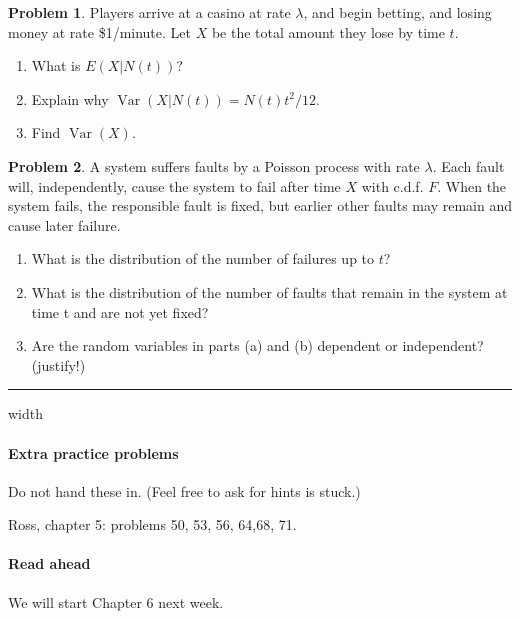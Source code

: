\documentclass{article}
\DeclareMathOperator{\Var}{Var}
\theoremstyle{definition}
\newtheorem{problem}{Problem}
\begin{document}

\begin{problem}
  Players arrive at a casino at rate $\lambda$, and begin betting, and losing money at rate \$1/minute.
  Let $X$ be the total amount they lose by time $t$.
  \begin{enumerate}
    \item What is $E(X|N(t))$?
    \item Explain why $\Var(X|N(t)) = N(t) t^2/12$.
    \item Find $\Var(X)$.
  \end{enumerate}
\end{problem}


\begin{problem}
  A system suffers faults by a Poisson process with rate $\lambda$.
  Each fault will, independently, cause the system to fail after time $X$ with
  c.d.f. $F$.
  When the system fails, the responsible fault is fixed, but earlier other faults may remain and cause later failure.
  \begin{enumerate}
  \item What is the distribution of the number of failures up to $t$?
  \item What is the distribution of the number of faults that remain in the system at time t and are not yet fixed?
  \item Are the random variables in parts (a) and (b) dependent or independent? (justify!)
  \end{enumerate}
\end{problem}


\hrule width \textwidth

\paragraph{Extra practice problems}
Do not hand these in. (Feel free to ask for hints is stuck.)

Ross, chapter 5: problems 50, 53, 56, 64,68, 71.

\paragraph{Read ahead}
We will start Chapter 6 next week.
\end{document}
